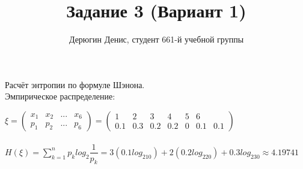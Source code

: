 \documentclass[20pt]{article}
\title{Задание 3 (Вариант 1)}
\author{
	Дерюгин Денис, студент 661-й учебной группы
}
\begin{document}
\large{
\maketitle
Расчёт энтропии по формуле Шэнона. \\

Эмпирическое распределение:

$\xi = \begin{pmatrix}
  x_1  & x_2 & ... & x_6\\ 
    p_1  & p_2 & ... & p_6
\end{pmatrix} = 
\begin{pmatrix}
1 & 2 & 3 & 4 & 5 & 6  \\ 
0.1 & 0.3 & 0.2 & 0.2 & 0 & 0.1 & 0.1
\end{pmatrix}
$ \\ \\


$H(\xi) = \sum_{k=1}^n p_k log_2\dfrac{1}{p_k} = 3 (0.1 log_210 ) + 2(0.2 log_220) + 0.3 log_230 \approx 4.19741$

}
\end{document}

